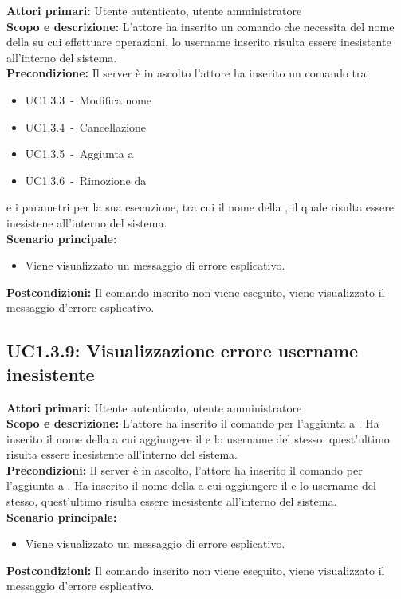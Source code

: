 \documentclass{scalatekids-article}
\begin{document}
\textbf{Attori primari:} Utente autenticato, utente amministratore\\
\textbf{Scopo e descrizione:} L'attore ha inserito un comando che necessita del nome della  su cui effettuare operazioni, lo username inserito risulta essere inesistente all'interno del sistema.\\
\textbf{Precondizione:}
Il server è in ascolto l'attore ha inserito un comando tra:
\begin{itemize}
\item UC1.3.3\ -\ Modifica nome 
\item UC1.3.4\ -\ Cancellazione 
\item UC1.3.5\ -\ Aggiunta  a 
\item UC1.3.6\ -\ Rimozione  da 
\end{itemize}
e i parametri per la sua esecuzione, tra cui il nome della , il quale risulta essere inesistene all'interno del sistema.\\
\textbf{Scenario principale:}
\begin{itemize}
\item Viene visualizzato un messaggio di errore esplicativo.
\end{itemize}
\textbf{Postcondizioni:} Il comando inserito non viene eseguito, viene visualizzato il messaggio d'errore esplicativo.

\subsection{UC1.3.9: Visualizzazione errore username inesistente}
\textbf{Attori primari:} Utente autenticato, utente amministratore\\
\textbf{Scopo e descrizione:}
L'attore ha inserito il comando per l'aggiunta  a
. Ha inserito il nome della  a cui
aggiungere il  e lo username del  stesso, quest'ultimo risulta essere inesistente all'interno
del sistema.\\
\textbf{Precondizioni:} Il server è in ascolto, l'attore ha inserito il comando per l'aggiunta  a
. Ha inserito il nome della  a cui
aggiungere il  e lo username del
 stesso, quest'ultimo risulta essere inesistente all'interno del sistema.\\
\textbf{Scenario principale:}
\begin{itemize}
\item Viene visualizzato un messaggio di errore esplicativo.
\end{itemize}
\textbf{Postcondizioni:} Il comando inserito non viene eseguito, viene visualizzato il messaggio d'errore esplicativo.
\end{document}
